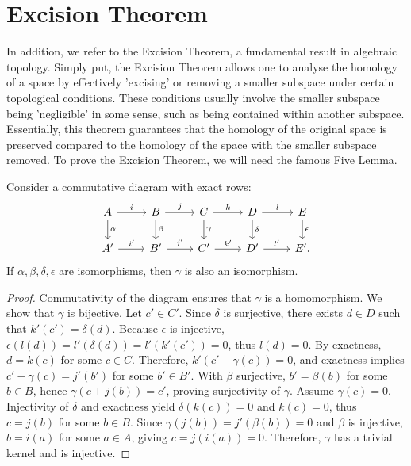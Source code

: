 \section{Excision Theorem}
\label{ExcisionTheorem}
In addition, we refer to the Excision Theorem, a fundamental result in algebraic topology. Simply put, the Excision Theorem allows one to analyse the homology of a space by effectively 'excising' or removing a smaller subspace under certain topological conditions. These conditions usually involve the smaller subspace being 'negligible' in some sense, such as being contained within another subspace. Essentially, this theorem guarantees that the homology of the original space is preserved compared to the homology of the space with the smaller subspace removed. To prove the Excision Theorem, we will need the famous Five Lemma.
\begin{lemma}{\cite[Exercise 1.3.3]{Weibel1994}}
	\label{fivelemma} Consider a commutative diagram with exact rows:
	\begin{equation}
		\begin{tikzcd}
			A \arrow[r, "i"] \arrow[d, "\alpha"] & B \arrow[r, "j"] \arrow[d, "\beta"]
			& C \arrow[r, "k"] \arrow[d, "\gamma"] & D \arrow[r, "l"] \arrow[d, "\delta"]
			& E \arrow[d, "\epsilon"] \\ A' \arrow[r, "i'"] & B' \arrow[r, "j'"] & C'
			\arrow[r, "k'"] & D' \arrow[r, "l'"] & E'.
		\end{tikzcd}
	\end{equation}
	If $\alpha, \beta, \delta, \epsilon$ are isomorphisms, then $\gamma$ is also an
	isomorphism.
\end{lemma}

\begin{proof}
	Commutativity of the diagram ensures that $\gamma$ is a homomorphism. We show that $\gamma$ is bijective. Let $c' \in C'$. Since $\delta$ is surjective, there exists $d \in D$ such that $k'(c') = \delta(d)$. Because $\epsilon$ is injective, $\epsilon(l(d)) = l'(\delta(d)) = l'(k'(c')) = 0$, thus $l(d) = 0$. By exactness, $d = k(c)$ for some $c \in C$. Therefore, $k'(c' - \gamma(c)) = 0$, and exactness implies $c' - \gamma(c) = j'(b')$ for some $b' \in B'$. With $\beta$ surjective, $b' = \beta(b)$ for some $b \in B$, hence $\gamma(c + j(b)) = c'$, proving surjectivity of $\gamma$. Assume $\gamma(c) = 0$. Injectivity of $\delta$ and exactness yield $\delta(k(c)) = 0$ and $k(c) = 0$, thus $c = j(b)$ for some $b \in B$. Since $\gamma(j(b)) = j'(\beta(b)) = 0$ and $\beta$ is injective, $b = i(a)$ for some $a \in A$, giving $c = j(i(a)) = 0$. Therefore, $\gamma$ has a trivial kernel and is injective.
\end{proof}

